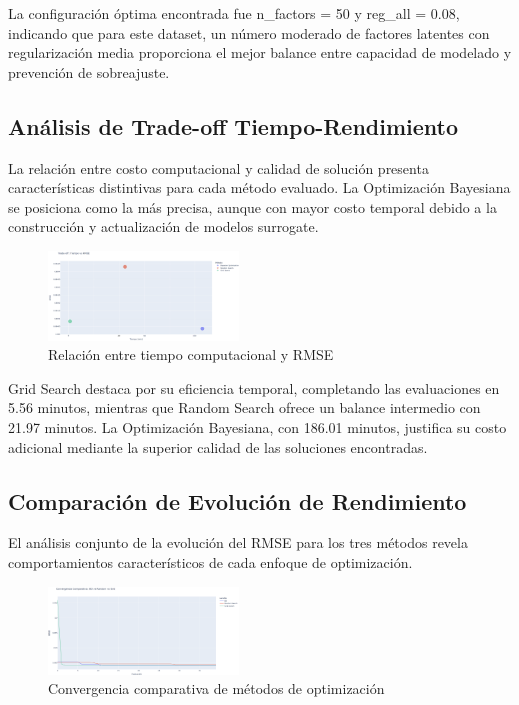 \documentclass[conference]{IEEEtran}
\begin{document}
La configuración óptima encontrada fue n\_factors = 50 y reg\_all = 0.08, indicando que para este dataset, un número moderado de factores latentes con regularización media proporciona el mejor balance entre capacidad de modelado y prevención de sobreajuste.

\subsection{Análisis de Trade-off Tiempo-Rendimiento}

La relación entre costo computacional y calidad de solución presenta características distintivas para cada método evaluado. La Optimización Bayesiana se posiciona como la más precisa, aunque con mayor costo temporal debido a la construcción y actualización de modelos surrogate.

\begin{figure}[htbp]
  \centering
  \includegraphics[width=0.45\textwidth]{fig_tradeoff.png}
  \caption{Relación entre tiempo computacional y RMSE}
  \label{fig:tradeoff}
\end{figure}

Grid Search destaca por su eficiencia temporal, completando las evaluaciones en 5.56 minutos, mientras que Random Search ofrece un balance intermedio con 21.97 minutos. La Optimización Bayesiana, con 186.01 minutos, justifica su costo adicional mediante la superior calidad de las soluciones encontradas.

\subsection{Comparación de Evolución de Rendimiento}

El análisis conjunto de la evolución del RMSE para los tres métodos revela comportamientos característicos de cada enfoque de optimización.

\begin{figure}[htbp]
  \centering
  \includegraphics[width=0.45\textwidth]{fig_bo_vs_random_vs_grid.png}
  \caption{Convergencia comparativa de métodos de optimización}
  \label{fig:comparacion}
\end{figure}
\end{document}
